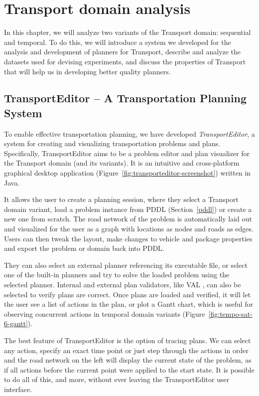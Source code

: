 \chapter{Transport domain analysis}

In this chapter, we will analyze two variants of the Transport domain: sequential and temporal. To do this, we will introduce a system we developed for the analysis
and development of planners for Transport, describe and analyze the datasets
used for devising experiments, and discuss the properties of Transport
that will help us in developing better quality planners.

\section{TransportEditor -- A Transportation Planning System}\label{transport-editor}

To enable effective transportation planning,
we have developed \textit{TransportEditor}, a system for creating and visualizing transportation problems and plans.
Specifically, TransportEditor aims to be a problem editor and plan visualizer for the Transport domain (and its variants). It is an intuitive and cross-platform graphical desktop application (Figure~\ref{fig:transporteditor-screenshot})
written in Java.

It allows the user to create a planning session, where they
select a Transport domain variant, load a problem instance from PDDL (Section~\ref{pddl}) or create a new one from scratch.
The road network of the problem is automatically laid out and visualized for the user as a graph with locations as nodes and roads as edges.
Users can then tweak the layout, make changes to vehicle and package properties
and export the problem or domain back into PDDL.

They can also select an external planner
referencing its executable file, or select one of the built-in planners and try to solve
the loaded problem using the selected planner. Internal and external plan validators, like VAL \citep{Howey2003}, can also be selected to verify plans are correct.
Once plans are loaded and verified, it will let the user see a list of actions
in the plan, or plot a Gantt chart, which is useful for observing concurrent actions in temporal domain variants (Figure~\ref{fig:tempo-sat-6-gantt}).

The best feature of TransportEditor is the option of tracing plans. We can select
any action, specify an exact time point or just step through the actions in order and
the road network on the left will display the current state of the problem, as if
all actions before the current point were applied to the start state.
It is possible to do all of this, and more, without ever leaving the TransportEditor user interface.

